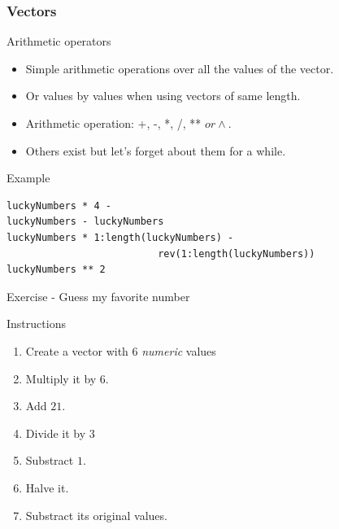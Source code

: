 \documentclass[10pt]{beamer}
\newenvironment{xframe}[2][]
  {\begin{frame}[fragile,environment=xframe,#1]
  \frametitle{#2}}
  {\end{frame}}
\begin{document}

\begin{xframe}{Vectors}
  \begin{block}{Arithmetic operators}
    \begin{itemize}
    \item Simple arithmetic operations over all the values of the {\sf vector}.
    \item Or values by values when using {\sf vector}s of same length.
    \item Arithmetic operation: +, -, *, /, ** \(or \wedge\).
    \item Others exist but let's forget about them for a while.
    \end{itemize}
  \end{block}
\begin{exampleblock}{Example}
\begin{verbatim}
luckyNumbers * 4 - 
luckyNumbers - luckyNumbers
luckyNumbers * 1:length(luckyNumbers) - 
                          rev(1:length(luckyNumbers))
luckyNumbers ** 2
\end{verbatim}
  \end{exampleblock}
\end{xframe}


\begin{frame}{Exercise - Guess my favorite number}
  \begin{block}{Instructions}
    \begin{enumerate}
    \item Create a {\sf vector} with 6 {\it numeric} values
    \item Multiply it by $6$.
    \item Add $21$.
    \item Divide it by $3$ 
    \item Substract $1$.
    \item Halve it.
    \item Substract its original values.
    \end{enumerate}
  \end{block}

  \note{}
\end{frame}


\end{document}
